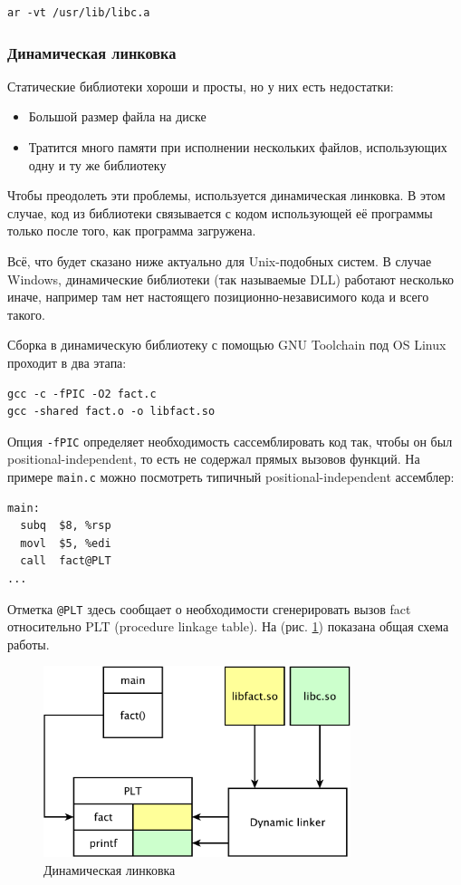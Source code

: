 \documentclass[a4paper,12pt,oneside]{article}
\begin{document}
\begin{verbatim}
ar -vt /usr/lib/libc.a
\end{verbatim}

\subsubsection{Динамическая линковка}\label{subsec:DynLink}

Статические библиотеки хороши и просты, но у них есть недостатки:

\begin{itemize}
\item Большой размер файла на диске
\item Тратится много памяти при исполнении нескольких файлов, использующих одну и ту же библиотеку
\end{itemize}

Чтобы преодолеть эти проблемы, используется динамическая линковка. В этом случае, код из библиотеки связывается с кодом использующей её программы только после того, как программа загружена. 

Всё, что будет сказано ниже актуально для Unix-подобных систем. В случае Windows, динамические библиотеки (так называемые DLL) работают несколько иначе, например там нет настоящего позиционно-независимого кода и всего такого.

Сборка в динамическую библиотеку с помощью GNU Toolchain под OS Linux проходит в два этапа:

\begin{verbatim}
gcc -c -fPIC -O2 fact.c
gcc -shared fact.o -o libfact.so
\end{verbatim}

Опция \lstinline!-fPIC! определяет необходимость сассемблировать код так, чтобы он был positional-independent, то есть не содержал прямых вызовов функций. На примере \lstinline!main.c! можно посмотреть типичный positional-independent ассемблер:

\begin{verbatim}
main:
  subq  $8, %rsp
  movl  $5, %edi
  call  fact@PLT
...
\end{verbatim}

Отметка \lstinline!@PLT! здесь сообщает о необходимости сгенерировать вызов fact относительно PLT (procedure linkage table). На (рис. \ref{fig:dl}) показана общая схема работы.

\begin{figure}[ht]
\centering
\includegraphics[width=0.8\textwidth]{illustrations/dl-scheme-crop.pdf}
\caption{Динамическая линковка}
\label{fig:dl}
\end{figure}
\end{document}
